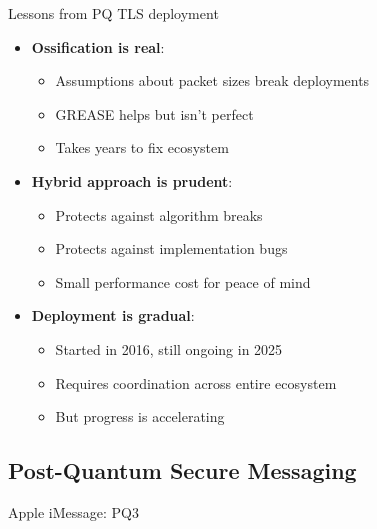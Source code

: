 \documentclass[aspectratio=169, lualatex, handout]{beamer}
\begin{document}
\begin{frame}{Lessons from PQ TLS deployment}
	\begin{itemize}
		\item \textbf{Ossification is real}:
		      \begin{itemize}
			      \item Assumptions about packet sizes break deployments
			      \item GREASE helps but isn't perfect
			      \item Takes years to fix ecosystem
		      \end{itemize}
		\item \textbf{Hybrid approach is prudent}:
		      \begin{itemize}
			      \item Protects against algorithm breaks
			      \item Protects against implementation bugs
			      \item Small performance cost for peace of mind
		      \end{itemize}
		\item \textbf{Deployment is gradual}:
		      \begin{itemize}
			      \item Started in 2016, still ongoing in 2025
			      \item Requires coordination across entire ecosystem
			      \item But progress is accelerating
		      \end{itemize}
	\end{itemize}
\end{frame}

\subsection{Post-Quantum Secure Messaging}
\begin{frame}{Apple iMessage: PQ3}
\end{frame}
\end{document}

